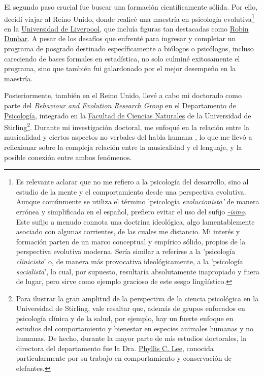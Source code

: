\documentclass[11pt,a4paper,]{awesome-cv}
\begin{document}
\begin{small}
El segundo paso crucial fue buscar una formación científicamente sólida. Por ello, decidí viajar al Reino Unido, donde realicé una maestría en psicología evolutiva\footnote{\scriptsize Es relevante aclarar que no me refiero a la psicología del desarrollo, sino al estudio de la mente y el comportamiento desde una perspectiva evolutiva. Aunque comúnmente se utiliza el término 'psicología \textit{evolucionista'} de manera errónea y simplificada en el español, prefiero evitar el uso del sufijo \href{https://dle.rae.es/-ismo}{\textit{-ismo}}. Este sufijo a menudo connota una doctrina ideológica, algo lamentablemente asociado con algunas corrientes, de las cuales me distancio. Mi interés y formación parten de un marco conceptual y empírico sólido, propios de la perspectiva evolutiva moderna. Sería similar a referirse a la 'psicología \textit{clinicista}' o, de manera más provocativa ideológicamente, a la 'psicología \textit{socialista}', lo cual, por supuesto, resultaría absolutamente inapropiado y fuera de lugar, pero sirve como ejemplo gracioso de este sesgo lingüístico.} en la \href{https://www.liverpool.ac.uk/}{Universidad de Liverpool}, que incluía figuras tan destacadas como \href{https://en.wikipedia.org/wiki/Robin_Dunbar}{Robin Dunbar}. A pesar de los desafíos que enfrenté para ingresar y completar un programa de posgrado destinado específicamente a biólogos o psicólogos, incluso careciendo de bases formales en estadística, no solo culminé exitosamente el programa, sino que también fui galardonado por el mejor desempeño en la maestría.

Posteriormente, también en el Reino Unido, llevé a cabo mi doctorado como parte del \textit{\href{https://www.stir.ac.uk/about/faculties/natural-sciences/our-research/research-groups/behaviour-and-evolution-research-group/}{Behaviour and Evolution Research Group}} en el \href{https://www.stir.ac.uk/about/faculties/natural-sciences/psychology/}{Departamento de Psicología}, integrado en la \href{https://www.stir.ac.uk/about/faculties/natural-sciences/departments/}{Facultad de Ciencias Naturales} de la Universidad de Stirling\footnote{\scriptsize Para ilustrar la gran amplitud de la perspectiva de la ciencia psicológica en la Universidad de Stirling, vale resaltar que, además de grupos enfocados en psicología clínica y de la salud, por ejemplo, hay un fuerte enfoque en estudios del comportamiento y bienestar en especies animales humanas y no humanas. De hecho, durante la mayor parte de mis estudios doctorales, la directora del departamento fue la Dra. \href{https://scholar.google.co.uk/citations?user=wxh9svQAAAAJ}{Phyllis C. Lee}, conocida particularmente por su trabajo en comportamiento y conservación de elefantes.}. Durante mi investigación doctoral, me enfoqué en la relación entre la musicalidad y ciertos aspectos no verbales del habla humana \autocite[e.g., ][]{leongomezVocalModulationCourtship2014}, lo que me llevó a reflexionar sobre la compleja relación entre la musicalidad y el lenguaje, y la posible conexión entre ambos fenómenos.


\end{small}
\end{document}
